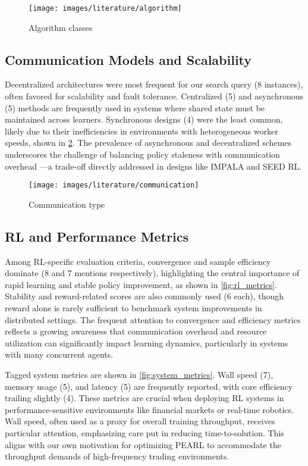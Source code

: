 \begin{figure}
    \centering
    \texttt{[image: images/literature/algorithm]}
    \caption{Algorithm classes}
    \label{fig:algorithm}
\end{figure}

\subsection{Communication Models and Scalability}

Decentralized architectures were most frequent for our search query (8 instances), often favored for scalability and fault tolerance.
Centralized (5) and asynchronous (5) methods are frequently used in systems where shared state must be maintained across learners.
Synchronous designs (4) were the least common, likely due to their inefficiencies in environments with heterogeneous worker speeds,
shown in \cref{fig:communication_type}.
The prevalence of asynchronous and decentralized schemes underscores the challenge of balancing policy staleness with communication overhead
—a trade-off directly addressed in designs like IMPALA and SEED RL.

\begin{figure}
    \centering
    \texttt{[image: images/literature/communication]}
    \caption{Communication type}
    \label{fig:communication_type}
\end{figure}

\subsection{RL and Performance Metrics}

Among RL-specific evaluation criteria, convergence and sample efficiency dominate (8 and 7 mentions respectively),
highlighting the central importance of rapid learning and stable policy improvement, as shown in \cref{fig:rl_metrics}.
Stability and reward-related scores are also commonly used (6 each), though reward alone is rarely sufficient to benchmark system improvements in distributed settings.
The frequent attention to convergence and efficiency metrics reflects a growing awareness that communication overhead and resource utilization can significantly
impact learning dynamics, particularly in systems with many concurrent agents.

Tagged system metrics are shown in \cref{fig:system_metrics}.
Wall speed (7), memory usage (5), and latency (5) are frequently reported, with core efficiency trailing slightly (4).
These metrics are crucial when deploying RL systems in performance-sensitive environments like financial markets or real-time robotics.
Wall speed, often used as a proxy for overall training throughput, receives particular attention,
emphasizing care put in reducing time-to-solution.
This aligns with our own motivation for optimizing PEARL to accommodate the throughput demands of high-frequency trading environments.

